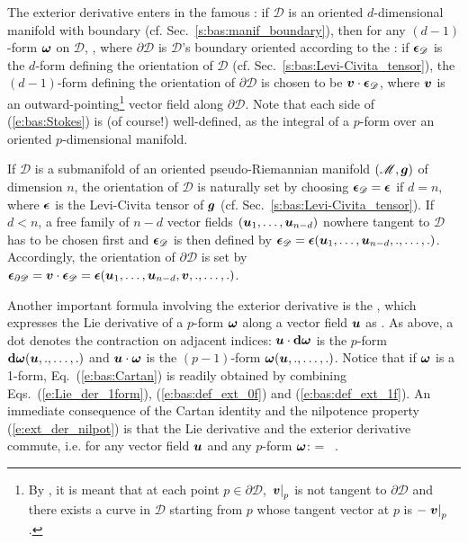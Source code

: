 The exterior derivative enters in the famous :
if $\mathscr{D}$ is an oriented $d$-dimensional manifold with boundary (cf. Sec.~\ref{s:bas:manif_boundary}), then for any
$(d-1)$-form $\bm{\omega}$ on $\mathscr{D}$,
\be \label{e:bas:Stokes}
   ,
\ee
where $\partial\mathscr{D}$ is $\mathscr{D}$'s boundary
oriented according to the : if $\bm{\epsilon}_{\mathscr{D}}$ is the $d$-form defining
the orientation of $\mathscr{D}$ (cf. Sec.~\ref{s:bas:Levi-Civita_tensor}), the $(d-1)$-form
defining the orientation of $\partial\mathscr{D}$ is chosen to be $\bm{v}\cdot\bm{\epsilon}_{\mathscr{D}}$,
where $\bm{v}$ is an outward-pointing\footnote{By , it is meant
that at each point $p\in\partial\mathscr{D}$, $\left.\bm{v}\right| _p$ is not tangent to $\partial\mathscr{D}$
and there exists a curve in $\mathscr{D}$ starting from $p$ whose tangent vector at $p$ is
$-\left.\bm{v}\right| _p$.}
vector field along $\partial\mathscr{D}$.
Note that each side of
(\ref{e:bas:Stokes}) is (of course!) well-defined,
as the integral of a $p$-form over an oriented $p$-dimensional manifold.

\begin{remark}
If $\mathscr{D}$ is a submanifold of an oriented pseudo-Riemannian manifold
$(\mathscr{M},\bm{g})$ of dimension $n$, the orientation of $\mathscr{D}$ is naturally set by choosing
$\bm{\epsilon}_{\mathscr{D}} = \bm{\epsilon}$ if $d=n$, where $\bm{\epsilon}$
is the Levi-Civita tensor of $\bm{g}$ (cf. Sec.~\ref{s:bas:Levi-Civita_tensor}).
If $d<n$, a free family of $n-d$ vector fields $(\bm{u}_1,\ldots,\bm{u}_{n-d})$
nowhere tangent to $\mathscr{D}$ has to be chosen first and $\bm{\epsilon}_{\mathscr{D}}$ is then
defined by
$\bm{\epsilon}_{\mathscr{D}} = \bm{\epsilon}(\bm{u}_1,\ldots,\bm{u}_{n-d},.,\ldots,.)$.
Accordingly, the orientation of $\partial\mathscr{D}$ is set by
$\bm{\epsilon}_{\partial\mathscr{D}} = \bm{v}\cdot\bm{\epsilon}_{\mathscr{D}} = \bm{\epsilon}(\bm{u}_1,\ldots,\bm{u}_{n-d},\bm{v},.,\ldots,.)$.
\end{remark}

Another important formula involving the exterior derivative is
the , which
expresses the Lie derivative of a $p$-form
$\bm{\omega}$ along a vector field $\bm{u}$ as
\be \label{e:bas:Cartan}
    .
\ee
As above, a dot denotes the contraction on adjacent indices:
$ \bm{u}\cdot\mathbf{d}\bm{\omega}$ is the $p$-form $\mathbf{d} \bm{\omega}(\bm{u},.,\ldots,.)$
and
$\bm{u}\cdot\bm{\omega}$ is the $(p-1)$-form $\bm{\omega}(\bm{u},.,\ldots,.)$.
Notice that if $\bm{\omega}$ is
a 1-form, Eq.~(\ref{e:bas:Cartan}) is readily obtained
by combining Eqs.~(\ref{e:Lie_der_1form}),
(\ref{e:bas:def_ext_0f}) and (\ref{e:bas:def_ext_1f}).
An immediate consequence of the Cartan identity and the nilpotence property
(\ref{e:ext_der_nilpot}) is that the Lie derivative
and the exterior derivative commute, i.e. for any vector field $\bm{u}$
and any $p$-form $\bm{\omega}$:
\be \label{e:bas:Lie_ext_commute}
     \dd \w{\omega} = \dd \, \! \w{\omega} .
\ee

